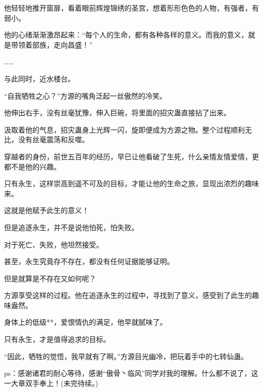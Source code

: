\begin{this_body}
他轻轻地推开窗扉，看着眼前辉煌锦绣的圣宫，想着形形色色的人物，有强者，有弱小。

他的心绪渐渐激昂起来：“每个人的生命，都有各种各样的意义。而我的意义，就是带领着部族，走向昌盛！”

……

与此同时，近水楼台。

“自我牺牲之心？”方源的嘴角泛起一丝傲然的冷笑。

他伸出右手，没有丝毫犹豫，伸入巨碗，将里面的招灾蛊直接拈了出来。

汲取着他的气息，招灾蛊身上光辉一闪，旋即便成为方源之物。整个过程顺利无比，没有丝毫震荡和反噬。

穿越者的身份，前世五百年的经历，早已让他看破了生死，什么亲情友情爱情，更都不是他的兴趣。

只有永生，这样崇高到遥不可及的目标，才能让他的生命之旅，显现出浓烈的趣味来。

这就是他赋予此生的意义！

但是追逐永生，并不是说他怕死，怕失败。

对于死亡、失败，他坦然接受。

甚至，永生究竟存不存在，都没有任何证据能够证明。

但是就算是不存在又如何呢？

方源享受这样的过程。他在追逐永生的过程中，寻找到了意义，感受到了此生的趣味盎然。

身体上的低级**，爱恨情仇的满足，他早就腻味了。

只有永生，才是值得追求的目标。

“因此，牺牲的觉悟，我早就有了啊。”方源目光幽冷，把玩着手中的七转仙蛊。

ps：感谢诸君的耐心等待，感谢“傲骨丶临风”同学对我的理解。什么都不说了，这一大章双手奉上！(未完待续。)

\end{this_body}


